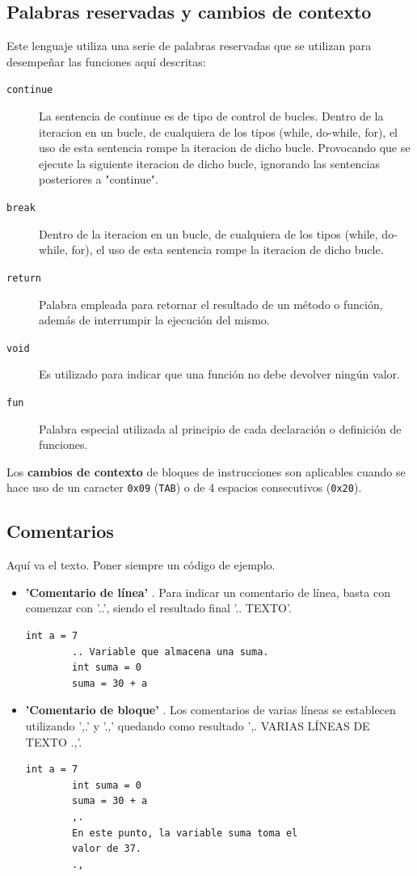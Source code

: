 \documentclass[11pt, english]{article}
\begin{document}
	\subsection{Palabras reservadas y cambios de contexto}
	Este lenguaje utiliza una serie de palabras reservadas que se utilizan para desempeñar las funciones aquí descritas:
	\begin{description}
		\item[\texttt{continue}] La sentencia de continue es de tipo de control de bucles. Dentro de la iteracion en un bucle, de cualquiera de los tipos (while, do-while, for), el uso de esta sentencia rompe la iteracion de dicho bucle. Provocando que se ejecute la siguiente iteracion de dicho bucle, ignorando las sentencias posteriores a "continue".
		\item[\texttt{break}] Dentro de la iteracion en un bucle, de cualquiera de los tipos (while, do-while, for), el uso de esta sentencia rompe la iteracion de dicho bucle.
		\item[\texttt{return}] Palabra empleada para retornar el resultado de un método o función, además de interrumpir la ejecución del mismo.
		\item[\texttt{void}] Es utilizado para indicar que una función no debe devolver ningún valor.
		\item[\texttt{fun}] Palabra especial utilizada al principio de cada declaración o definición de funciones.
	\end{description}
	
	Los \textbf{cambios de contexto} de bloques de instrucciones son aplicables cuando se hace uso de un caracter \texttt{0x09} (\texttt{TAB}) o de 4 espacios consecutivos (\texttt{0x20}).
	
	\subsection{Comentarios}
	Aquí va el texto. Poner siempre un código de ejemplo.
	\begin{itemize}
		\item \textbf{'Comentario de línea'} . Para indicar un comentario de línea, basta con comenzar con '..', siendo el resultado final '.. {TEXTO}'.
		\begin{lstlisting}[caption=Ejemplo de comentario de línea]
		int a = 7
		.. Variable que almacena una suma.
		int suma = 0
		suma = 30 + a
		\end{lstlisting}
		\item \textbf{'Comentario de bloque'} . Los comentarios de varias líneas se establecen utilizando ',.' y '.,'  quedando como resultado ',. {VARIAS LÍNEAS DE TEXTO} .,'.
		\begin{lstlisting}[caption=Ejemplo de comentario de bloque]
		int a = 7
		int suma = 0
		suma = 30 + a
		,.
		En este punto, la variable suma toma el
		valor de 37.
		.,
		\end{lstlisting}
	\end{itemize}
	
\end{document}
